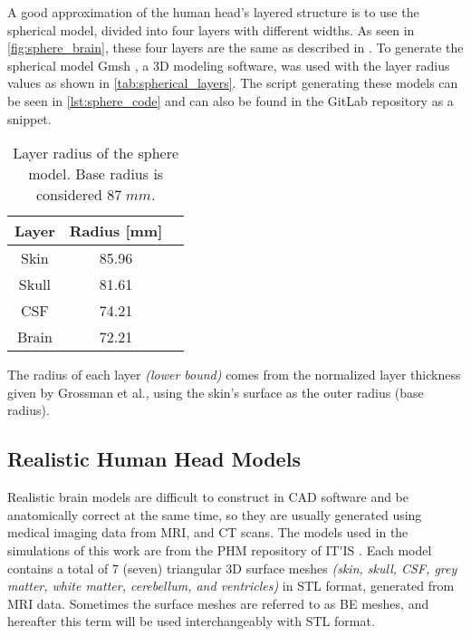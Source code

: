 A good approximation of the human head's layered structure is to use the spherical model, divided into four layers with different widths. As seen in \autoref{fig:sphere_brain}, these four layers are the same as described in . To generate the spherical model Gmsh \cite{gmsh}, a 3D modeling software, was used with the layer radius values as shown in \autoref{tab:spherical_layers}. The script generating these models can be seen in \autoref{lst:sphere_code} and can also be found in the GitLab repository \cite{thesis_repo} as a snippet.
\begin{table}[!ht]
\begin{minipage}{.62\linewidth}
\centering
\caption{Layer radius of the sphere model. Base radius is considered $87\;\si{mm}$.}
\label{tab:spherical_layers}
\begin{tabular}{|c|c|c|}
\hline
\rowcolor[HTML]{C0C0C0} 
{\color[HTML]{000000} \textbf{Layer}} & {\color[HTML]{000000} \textbf{Radius {[}mm{]}}} \\ \hline
Skin & 85.96 \\ \hline
Skull & 81.61 \\ \hline
CSF & 74.21 \\ \hline
Brain & 72.21 \\ \hline
\end{tabular}
\end{minipage}
\end{table}

\noindent The radius of each layer \textit{(lower bound)} comes from the normalized layer thickness given by Grossman et al.\cite[Figure S2, J, and K]{Grossman2017}, using the skin's surface as the outer radius (base radius).

\pagebreak
\subsection{Realistic Human Head Models}
\label{sec:phm_models}

Realistic brain models are difficult to construct in \gls{CAD} software and be anatomically correct at the same time, so they are usually generated using medical imaging data from \gls{MRI}, and \gls{CT} scans. The models used in the simulations of this work are from the \gls{PHM} repository of \gls{IT'IS} \cite{ErikG.Lee2016,Lee2018,Lee2016}. Each model contains a total of 7 (seven) triangular 3D surface meshes \textit{(skin, skull, \gls{CSF}, grey matter, white matter, cerebellum, and ventricles)} in \gls{STL} format, generated from \gls{MRI} data. Sometimes the surface meshes are referred to as \gls{BE} meshes, and hereafter this term will be used interchangeably with \gls{STL} format.

